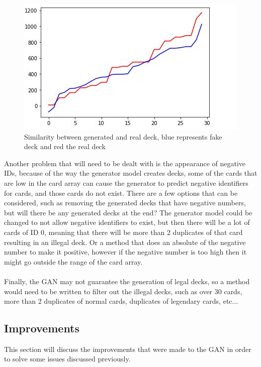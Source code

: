 \documentclass{report} %
\begin{document}
\begin{figure}[H]
\centering
\includegraphics[width=1\textwidth]{initialTraining}
\caption{Similarity between generated and real deck, blue represents fake deck and red the real deck \protect}
\label{board}
\end{figure}

Another problem that will need to be dealt with is the appearance of negative IDs, because of the way the generator model creates decks, some of the cards that are low in the card array can cause the generator to predict negative identifiers for cards, and those cards do not exist. There are a few options that can be considered, such as removing the generated decks that have negative numbers, but will there be any generated decks at the end? The generator model could be changed to not allow negative identifiers to exist, but then there will be a lot of cards of ID 0, meaning that there will be more than 2 duplicates of that card resulting in an illegal deck. Or a method that does an absolute of the negative number to make it positive, however if the negative number is too high then it might go outside the range of the card array.\\ \\
Finally, the GAN may not guarantee the generation of legal decks, so a method would need to be written to filter out the illegal decks, such as over 30 cards, more than 2 duplicates of normal cards, duplicates of legendary cards, etc...

\subsection{Improvements}
This section will discuss the improvements that were made to the GAN in order to solve some issues discussed previously.
\end{document}
